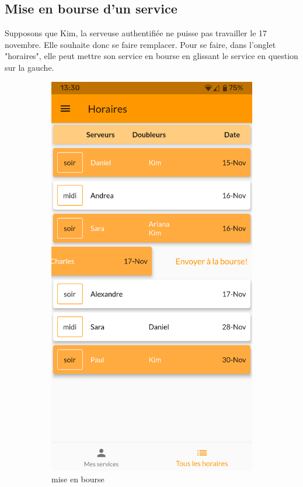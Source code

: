     \subsection*{Mise en bourse d'un service}
    Supposons que Kim, la serveuse authentifiée ne puisse pas travailler le 17 novembre.
    Elle souhaite donc se faire remplacer. Pour se faire, dans l'onglet 
    "horaires", elle peut mettre son service en bourse en glissant le 
    service en question sur la gauche.
    \begin{figure}[!h]
        \centering
        \begin{subfigure}{.45\textwidth}
            \centering
            \includegraphics[width=0.6\linewidth]{screenshots/scenario_02/mise_en_bourse.png}
            \caption{mise en bourse}
            \label{fig:mise_en_bourse}
        \end{subfigure}
        \begin{subfigure}{.45\textwidth}
            \centering

\end{subfigure}
\end{figure}
